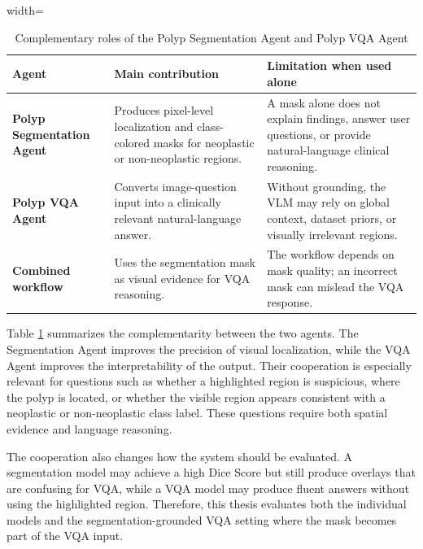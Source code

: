 \begin{table}[H]
\centering
\begin{adjustbox}{width=\textwidth}
\begin{tabular}{>{\RaggedRight\arraybackslash}p{} >{\RaggedRight\arraybackslash}p{} >{\RaggedRight\arraybackslash}p{}}
\hline\hline
\textbf{Agent} & \textbf{Main contribution} & \textbf{Limitation when used alone} \\
\hline
\textbf{Polyp Segmentation Agent} & Produces pixel-level localization and class-colored masks for neoplastic or non-neoplastic regions. & A mask alone does not explain findings, answer user questions, or provide natural-language clinical reasoning. \\
\textbf{Polyp VQA Agent} & Converts image-question input into a clinically relevant natural-language answer. & Without grounding, the VLM may rely on global context, dataset priors, or visually irrelevant regions. \\
\textbf{Combined workflow} & Uses the segmentation mask as visual evidence for VQA reasoning. & The workflow depends on mask quality; an incorrect mask can mislead the VQA response. \\
\hline\hline
\end{tabular}
\end{adjustbox}
\caption{Complementary roles of the Polyp Segmentation Agent and Polyp VQA Agent}
\label{table:segmentation-vqa-cooperation}
\end{table}

Table \ref{table:segmentation-vqa-cooperation} summarizes the complementarity between the two agents. The Segmentation Agent improves the precision of visual localization, while the VQA Agent improves the interpretability of the output. Their cooperation is especially relevant for questions such as whether a highlighted region is suspicious, where the polyp is located, or whether the visible region appears consistent with a neoplastic or non-neoplastic class label. These questions require both spatial evidence and language reasoning.

The cooperation also changes how the system should be evaluated. A segmentation model may achieve a high Dice Score but still produce overlays that are confusing for VQA, while a VQA model may produce fluent answers without using the highlighted region. Therefore, this thesis evaluates both the individual models and the segmentation-grounded VQA setting where the mask becomes part of the VQA input.

